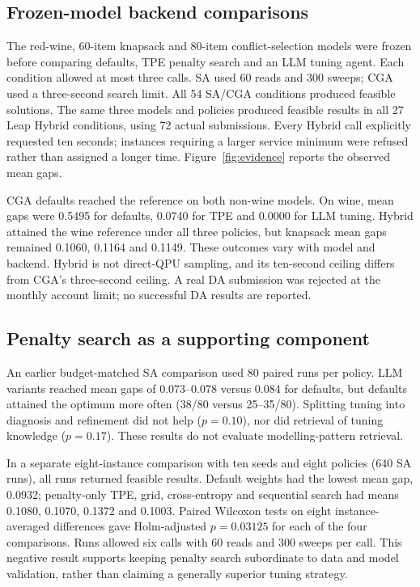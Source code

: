 \subsection{Frozen-model backend comparisons}
The red-wine, 60-item knapsack and 80-item conflict-selection models were frozen before comparing defaults,
TPE penalty search and an LLM tuning agent. Each condition allowed at most three calls. SA used 60 reads and
300 sweeps; CGA used a three-second search limit. All 54 SA/CGA conditions produced feasible solutions.
The same three models and policies produced feasible results in all 27 Leap Hybrid conditions, using 72 actual
submissions. Every Hybrid call explicitly requested ten seconds; instances requiring a larger service minimum
were refused rather than assigned a longer time. Figure~\ref{fig:evidence} reports the observed mean gaps.



CGA defaults reached the reference on both non-wine models. On wine, mean gaps were 0.5495 for defaults,
0.0740 for TPE and 0.0000 for LLM tuning. Hybrid attained the wine reference under all three policies, but
knapsack mean gaps remained 0.1060, 0.1164 and 0.1149. These outcomes vary with model and backend.
Hybrid is not direct-QPU sampling, and its ten-second ceiling differs from CGA's three-second ceiling.
A real DA submission was rejected at the monthly account limit; no successful DA results are reported.

\subsection{Penalty search as a supporting component}
An earlier budget-matched SA comparison used 80 paired runs per policy. LLM variants reached mean gaps of
0.073--0.078 versus 0.084 for defaults, but defaults attained the optimum more often (38/80 versus 25--35/80).
Splitting tuning into diagnosis and refinement did not help ($p=0.10$), nor did retrieval of tuning knowledge
($p=0.17$). These results do not evaluate modelling-pattern retrieval.

In a separate eight-instance comparison with ten seeds and eight policies (640 SA runs), all runs returned
feasible results. Default weights had the lowest mean gap, 0.0932; penalty-only TPE, grid, cross-entropy and
sequential search had means 0.1080, 0.1070, 0.1372 and 0.1003. Paired Wilcoxon tests on eight instance-averaged
differences gave Holm-adjusted $p=0.03125$ for each of the four comparisons. Runs allowed six calls with 60
reads and 300 sweeps per call. This negative result supports keeping penalty search subordinate to data and
model validation, rather than claiming a generally superior tuning strategy.

